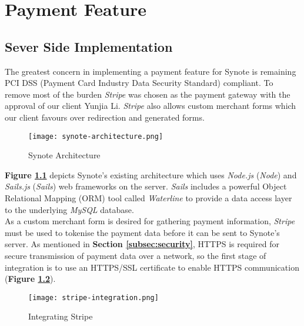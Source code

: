 \chapter{Payment Feature}
\label{chap:payment-feature}


\section{Sever Side Implementation}
\label{sec:server-side-implementation}

The greatest concern in implementing a payment feature for Synote is remaining PCI DSS (Payment Card Industry Data Security Standard) compliant. To remove most of the burden \textit{Stripe} was chosen as the payment gateway with the approval of our client Yunjia Li. \textit{Stripe} also allows custom merchant forms which our client favours over redirection and generated forms.\\

\begin{figure}[!hbt]
  \centering
 	\texttt{[image: synote-architecture.png]}
  \caption{Synote Architecture}
 	\label{fig:synote-architecture}
\end{figure}

\textbf{Figure \ref{fig:synote-architecture}} depicts Synote's existing architecture which uses \textit{Node.js} (\textit{Node}) and \textit{Sails.js} (\textit{Sails}) web frameworks on the server. \textit{Sails} includes a powerful Object Relational Mapping (ORM) tool called \textit{Waterline} to provide a data access layer to the underlying \textit{MySQL} database.\\

As a custom merchant form is desired for gathering payment information, \textit{Stripe} must be used to tokenise the payment data before it can be sent to Synote's server. As mentioned in \textbf{Section \ref{subsec:security}}, HTTPS is required for secure transmission of payment data over a network, so the first stage of integration is to use an HTTPS/SSL certificate to enable HTTPS communication (\textbf{Figure \ref{fig:stripe-integration}}).\\

\begin{figure}[!hbt]
  \centering
 	\texttt{[image: stripe-integration.png]}
  \caption{Integrating Stripe}
 	\label{fig:stripe-integration}
\end{figure}

